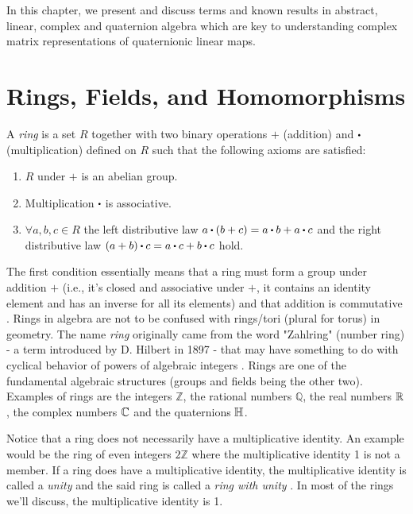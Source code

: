 In this chapter, we present and discuss terms and known results in abstract, linear, complex and quaternion algebra which are key to understanding complex matrix representations of quaternionic linear maps.

\section{Rings, Fields, and Homomorphisms}
\begin{definition}[Ring] \label{def:ring}
	\cite{fraleigh} A \emph{ring} is a set $R$ together with two binary operations $+$ (addition) and $\bigcdot$ (multiplication) defined on $R$ such that the following axioms are satisfied:
	\begin{varwidth}[t]{.9\textwidth}
	\centering
\begin{enumerate}
\item $R$ under $+$ is an abelian group.
\item Multiplication $\bigcdot$ is associative.
\item $\forall a,b,c \in R$ the left distributive law $a\bigcdot(b+c)=a\bigcdot b + a\bigcdot c$ and the right distributive law $(a+b)\bigcdot c = a\bigcdot c + b\bigcdot c$ hold.
\end{enumerate}
\end{varwidth}
\newline
\end{definition}

The first condition essentially means that a ring must form a group under addition $+$ (i.e., it's closed and associative under $+$, it contains an identity element and has an inverse for all its elements) and that addition is commutative \cite{fraleigh}. Rings in algebra are not to be confused with rings/tori (plural for torus) in geometry. The name \emph{ring} originally came from the word "Zahlring" (number ring) - a term introduced by D. Hilbert in 1897 - that may have something to do with cyclical behavior of powers of algebraic integers \cite{yrings}. Rings are one of the fundamental algebraic structures (groups and fields being the other two). Examples of rings are the integers $\mathbb{Z}$, the rational numbers $\mathbb{Q}$, the real numbers $\operatorname{\mathbb{R}}$, the complex numbers $\operatorname{\mathbb{C}}$ and the quaternions $\operatorname{\mathbb{H}}$. 

Notice that a ring does not necessarily have a multiplicative identity. An example would be the ring of even integers $2\mathbb{Z}$ where the multiplicative identity 1 is not a member. If a ring does have a multiplicative identity, the multiplicative identity is called a \emph{unity} and the said ring is called a \emph{ring with unity} \cite{fraleigh}. In most of the rings we'll discuss, the multiplicative identity is 1. 

